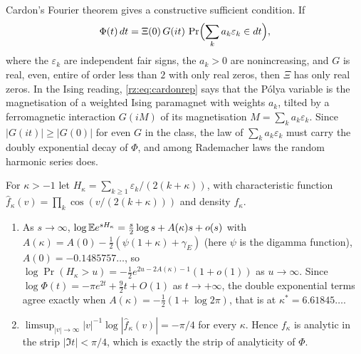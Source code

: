Cardon's Fourier theorem \cite[Theorem~1]{Cardon2005} gives a constructive sufficient condition. If
\begin{equation}\label{rz:eq:cardonrep}
\Phi(t)\,dt=\Xi(0)\,G(it)\,\Pr\Bigl(\sum_ka_k\varepsilon_k\in dt\Bigr),
\end{equation}
where the $\varepsilon_k$ are independent fair signs, the $a_k>0$ are nonincreasing, and $G$ is real, even, entire of order less than $2$ with only real zeros, then $\Xi$ has only real zeros. In the Ising reading, \eqref{rz:eq:cardonrep} says that the P\'olya variable is the magnetisation of a weighted Ising paramagnet with weights $a_k$, tilted by a ferromagnetic interaction $G(iM)$ of its magnetisation $M=\sum_ka_k\varepsilon_k$. Since $|G(it)|\ge|G(0)|$ for even $G$ in the class, the law of $\sum_ka_k\varepsilon_k$ must carry the doubly exponential decay of $\Phi$, and among Rademacher laws the random harmonic series does.

\begin{proposition}\label{rz:prop:harmonic}
For $\kappa>-1$ let $H_\kappa=\sum_{k\ge1}\varepsilon_k/(2(k+\kappa))$, with characteristic function $\hat f_\kappa(v)=\prod_k\cos(v/(2(k+\kappa)))$ and density $f_\kappa$.
\begin{enumerate}
\item[(i)] As $s\to\infty$, $\log\mathbb{E} e^{s H_\kappa}=\frac s2\log s+A(\kappa)s+o(s)$ with $A(\kappa)=A(0)-\frac12(\psi(1+\kappa)+\gamma_E)$ (here $\psi$ is the digamma function), $A(0)=-0.1485757\ldots$, so $\log\Pr(H_\kappa>u)=-\frac12e^{2u-2A(\kappa)-1}(1+o(1))$ as $u\to\infty$. Since $\log\Phi(t)=-\pi e^{2t}+\frac92t+O(1)$ as $t\to+\infty$, the double exponential terms agree exactly when $A(\kappa)=-\frac12(1+\log2\pi)$, that is at $\kappa^*=6.61845\ldots$.
\item[(ii)] $\limsup_{|v|\to\infty}|v|^{-1}\log|\hat f_\kappa(v)|=-\pi/4$ for every $\kappa$. Hence $f_\kappa$ is analytic in the strip $|\Im t|<\pi/4$, which is exactly the strip of analyticity of $\Phi$.
\end{enumerate}
\end{proposition}

